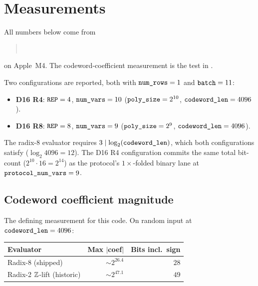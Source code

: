 \section{Measurements}
\label{sec:measurements}

All numbers below come from
\begin{quote}\small
{}\\
\end{quote}
on Apple~M4. The codeword-coefficient measurement is the test
 in
.

Two configurations are reported, both with $\texttt{num\_rows} = 1$ and
$\texttt{batch} = 11$:
\begin{itemize}
  \item \textbf{D16 R4}: $\texttt{REP} = 4$, $\texttt{num\_vars} = 10$
    ($\texttt{poly\_size} = 2^{10}$, $\texttt{codeword\_len} = 4096$).
  \item \textbf{D16 R8}: $\texttt{REP} = 8$, $\texttt{num\_vars} = 9$
    ($\texttt{poly\_size} = 2^{9}$, $\texttt{codeword\_len} = 4096$).
\end{itemize}
The radix-8 evaluator requires $3 \mid \log_2(\texttt{codeword\_len})$,
which both configurations satisfy ($\log_2 4096 = 12$). The D16 R4
configuration commits the same total bit-count
($2^{10}\cdot 16 = 2^{14}$) as the protocol's $1\times$-folded binary
lane at $\texttt{protocol\_num\_vars} = 9$.

\subsection{Codeword coefficient magnitude}
\label{sec:meas-coef}

The defining measurement for this code. On random
 input at $\texttt{codeword\_len} = 4096$:

\begin{center}\small
\begin{tabular}{lrr}
  \toprule
  Evaluator & Max $|$coef$|$ & Bits incl.\ sign \\
  \midrule
  Radix-8 (shipped)           & $\sim 2^{26.4}$ & $28$ \\
  Radix-2 $\mathbb{Z}$-lift (historic)& $\sim 2^{47.1}$ & $49$ \\
  \bottomrule
\end{tabular}
\end{center}

